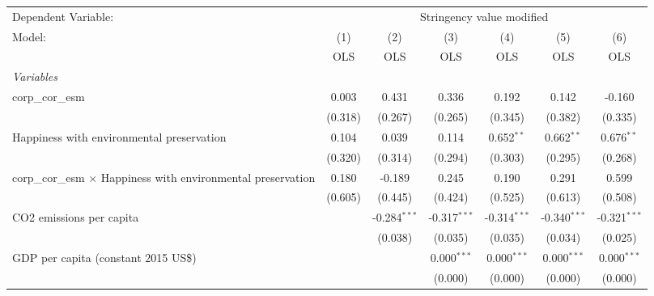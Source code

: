 
\begingroup
\centering
\begin{tabular}{lcccccc}
   \toprule
   Dependent Variable: & \multicolumn{6}{c}{Stringency value modified}\\
   Model:                                                               & (1)     & (2)            & (3)            & (4)            & (5)            & (6)\\  
                                                                        &  OLS    & OLS            & OLS            & OLS            & OLS            & OLS\\  
   \midrule
   \emph{Variables}\\
   corp\_cor\_esm                                                       & 0.003   & 0.431          & 0.336          & 0.192          & 0.142          & -0.160\\   
                                                                        & (0.318) & (0.267)        & (0.265)        & (0.345)        & (0.382)        & (0.335)\\   
   Happiness with environmental preservation                            & 0.104   & 0.039          & 0.114          & 0.652$^{**}$   & 0.662$^{**}$   & 0.676$^{**}$\\   
                                                                        & (0.320) & (0.314)        & (0.294)        & (0.303)        & (0.295)        & (0.268)\\   
   corp\_cor\_esm $\times$ Happiness with environmental preservation    & 0.180   & -0.189         & 0.245          & 0.190          & 0.291          & 0.599\\   
                                                                        & (0.605) & (0.445)        & (0.424)        & (0.525)        & (0.613)        & (0.508)\\   
   CO2 emissions per capita                                             &         & -0.284$^{***}$ & -0.317$^{***}$ & -0.314$^{***}$ & -0.340$^{***}$ & -0.321$^{***}$\\   
                                                                        &         & (0.038)        & (0.035)        & (0.035)        & (0.034)        & (0.025)\\   
   GDP per capita (constant 2015 US\$)                                  &         &                & 0.000$^{***}$  & 0.000$^{***}$  & 0.000$^{***}$  & 0.000$^{***}$\\   
                                                                        &         &                & (0.000)        & (0.000)        & (0.000)        & (0.000)\\   

\end{tabular}
